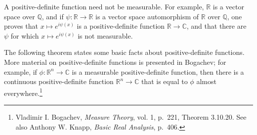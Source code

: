 \documentclass{article}
\theoremstyle{definition}
\begin{document}
A positive-definite function need not be measurable. For example, $\mathbb{R}$ is a vector space over $\mathbb{Q}$,
and if $\psi:\mathbb{R} \to \mathbb{R}$ is a vector space automorphism of $\mathbb{R}$ over $\mathbb{Q}$, one proves that
$x \mapsto e^{i\psi(x)}$ is a positive-definite function $\mathbb{R} \to \mathbb{C}$, and that there are $\psi$
for which $x \mapsto e^{i\psi(x)}$  is not measurable.

The following theorem states some basic facts about positive-definite functions.    
More material on positive-definite functions is presented in Bogachev; for example, 
if $\phi:\mathbb{R}^n \to \mathbb{C}$ is a measurable positive-definite function, then there is a continuous
positive-definite function $\mathbb{R}^n \to \mathbb{C}$ that is equal to $\phi$ almost everywhere.\footnote{Vladimir I. Bogachev, {\em Measure Theory}, vol. 1, p.~221, Theorem 3.10.20. See also Anthony W. Knapp, {\em Basic Real Analysis}, p.~406.}
\end{document}
